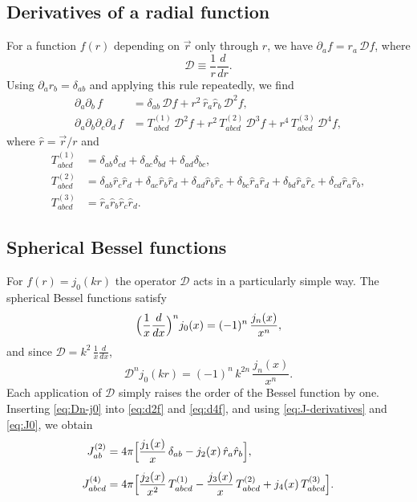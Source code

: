 \documentclass[12pt,a4paper,oneside]{article}
\numberwithin{equation}{section}   %
\begin{document}
\subsection{Derivatives of a radial function}
For a function $f(r)$ depending on $\vec r$ only through $r$, we have
$\partial_a f=r_a\,\mathcal D f$, where
\begin{equation}
\mathcal D\equiv\frac{1}{r}\frac{d}{dr} .
\end{equation}
Using $\partial_a r_b=\delta_{ab}$ and applying this rule repeatedly, we find
\begin{align}
\partial_a\partial_b\, f &= \delta_{ab}\,\mathcal D f
+ r^2\,\hat r_a\hat r_b\,\mathcal D^2 f,
\label{eq:d2f}\\[4pt]
\partial_a\partial_b\partial_c\partial_d\, f &=
T^{(1)}_{abcd}\,\mathcal D^2 f + r^2\,T^{(2)}_{abcd}\,\mathcal D^3 f
+ r^4\,T^{(3)}_{abcd}\,\mathcal D^4 f,
\label{eq:d4f}
\end{align}
where $\hat r=\vec r/r$ and
\begin{align}
T^{(1)}_{abcd} &= \delta_{ab}\delta_{cd}+\delta_{ac}\delta_{bd}+\delta_{ad}\delta_{bc}, \\
T^{(2)}_{abcd} &= \delta_{ab}\hat r_c\hat r_d+\delta_{ac}\hat r_b\hat r_d+\delta_{ad}\hat r_b\hat r_c
+\delta_{bc}\hat r_a\hat r_d+\delta_{bd}\hat r_a\hat r_c+\delta_{cd}\hat r_a\hat r_b, \\
T^{(3)}_{abcd} &= \hat r_a\hat r_b\hat r_c\hat r_d .
\end{align}

\subsection{Spherical Bessel functions}
For $f(r)=j_0(kr)$ the operator $\mathcal D$ acts in a particularly simple
way. The spherical Bessel functions satisfy
\begin{equation}
\Bigl(\frac{1}{x}\frac{d}{dx}\Bigr)^{n} j_0(x)=(-1)^n\,\frac{j_n(x)}{x^{n}},
\end{equation}
and since $\mathcal D=k^2\,\frac{1}{x}\frac{d}{dx}$,
\begin{equation}
\mathcal D^{n} j_0(kr)=(-1)^n\,k^{2n}\,\frac{j_n(x)}{x^{n}} .
\label{eq:Dn-j0}
\end{equation}
Each application of $\mathcal D$ simply raises the order of the Bessel function
by one. Inserting \eqref{eq:Dn-j0} into \eqref{eq:d2f} and \eqref{eq:d4f}, and
using \eqref{eq:J-derivatives} and \eqref{eq:J0}, we obtain
\begin{align}
J^{(2)}_{ab}
&= 4\pi\Bigl[\frac{j_1(x)}{x}\,\delta_{ab}-j_2(x)\,\hat r_a\hat r_b\Bigr],
\label{eq:J2}\\[4pt]
J^{(4)}_{abcd}
&= 4\pi\Bigl[\frac{j_2(x)}{x^2}\,T^{(1)}_{abcd}-\frac{j_3(x)}{x}\,T^{(2)}_{abcd}
+j_4(x)\,T^{(3)}_{abcd}\Bigr].
\label{eq:J4}
\end{align}
\end{document}
